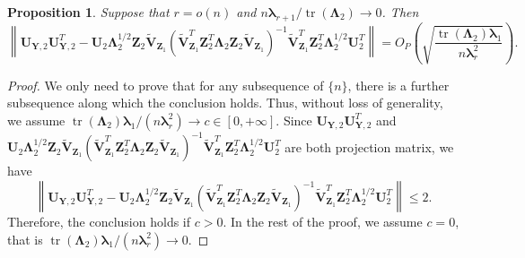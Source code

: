 \documentclass[12pt]{article} %
\DeclareMathOperator{\mytr}{tr}
\newcommand{\bZ}{\mathbf{Z}}
\newcommand{\bY}{\mathbf{Y}}
\newcommand{\bU}{\mathbf{U}}
\newcommand{\bV}{\mathbf{V}}
\newcommand{\bfsym}[1]{\ensuremath{\boldsymbol{#1}}}
\def\blambda {\bfsym {\lambda}}
\def\bLambda {\bfsym {\Lambda}}
\newtheorem{proposition}{Proposition}
\theoremstyle{definition}
\begin{document}
\begin{appendices}
\begin{proposition}
    \label{eigenvectorprop2}
    Suppose that $r=o(n)$ and $n\blambda_{r+1} /\mytr(\bLambda_2)\to 0$. Then
    \begin{equation*}
            \left\|\bU_{\bY,2}\bU_{\bY,2}^{T}-
            \bU_2 \bLambda_2^{1/2}\bZ_{2} \tilde{\bV}_{\bZ_1}
            \left(\tilde{\bV}_{\bZ_1}^T \bZ_2^T \bLambda_2 \bZ_2 \tilde{\bV}_{\bZ_1}\right)^{-1}
            \tilde{\bV}_{\bZ_1}^T \bZ_2^T \bLambda_2^{1/2} \bU_2^T
            \right\|
    = 
    O_P\left(
        \sqrt{\frac{\mytr(\bLambda_2) \blambda_1}{n\blambda_r^2}}
    \right)
    .
    \end{equation*}
\end{proposition}
\begin{proof}
    We only need to prove that for any subsequence of $\{n\}$, there is a further subsequence along which the conclusion holds.
    Thus, without loss of generality, we assume $\mytr(\bLambda_2)\blambda_1 /{(n \blambda_r^2)}\to c\in [0,+\infty]$.
    Since $
            \bU_{\bY,2}\bU_{\bY,2}^{T}
    $ and 
    $
            \bU_2 \bLambda_2^{1/2}\bZ_{2} \tilde{\bV}_{\bZ_1}
            \left(\tilde{\bV}_{\bZ_1}^T \bZ_2^T \bLambda_2 \bZ_2 \tilde{\bV}_{\bZ_1}\right)^{-1}
            \tilde{\bV}_{\bZ_1}^T \bZ_2^T \bLambda_2^{1/2} \bU_2^T
            $
            are both projection matrix, we have
    \begin{equation*}
            \left\|\bU_{\bY,2}\bU_{\bY,2}^{T}-
            \bU_2 \bLambda_2^{1/2}\bZ_{2} \tilde{\bV}_{\bZ_1}
            \left(\tilde{\bV}_{\bZ_1}^T \bZ_2^T \bLambda_2 \bZ_2 \tilde{\bV}_{\bZ_1}\right)^{-1}
            \tilde{\bV}_{\bZ_1}^T \bZ_2^T \bLambda_2^{1/2} \bU_2^T
            \right\|
            \leq 2
    .
    \end{equation*}
    Therefore, the conclusion holds if $c>0$.
    In the rest of the proof, we assume $c=0$, that is $\mytr(\bLambda_2)\blambda_1 /{(n \blambda_r^2)}\to 0$.



\end{proof}
\end{appendices}
\end{document}
